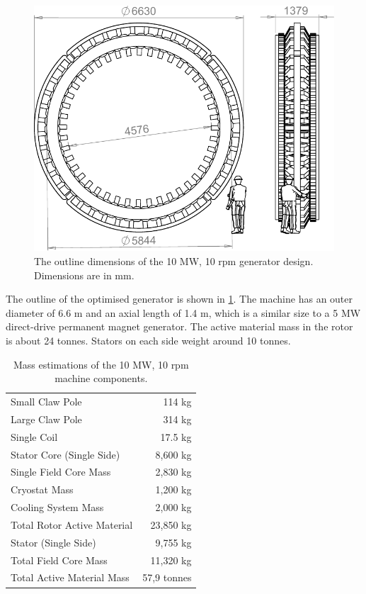 \documentclass[12pt]{iopart}
\begin{document}
\begin{figure}[t]
  \centering
    \includegraphics[]{10MW_outline_drawing}
  \caption{The outline dimensions of the 10 MW, 10 rpm generator design. Dimensions are in mm.}
  \label{10MW_drawing}
\end{figure}

The outline of the optimised generator is shown in \ref{10MW_drawing}. The machine has an outer diameter of 6.6 m and an axial length of 1.4 m, which is a similar size to a 5 MW direct-drive permanent magnet generator.
The active material mass in the rotor is about 24 tonnes. Stators on each side weight around 10 tonnes.

\begin{table}[t]
  \centering
  \begin{tabular}{lr}
\hline
Small Claw Pole & 114 kg \\
Large Claw Pole & 314 kg \\
Single Coil & 17.5 kg \\
Stator Core (Single Side) & 8,600 kg \\
Single Field Core Mass & 2,830 kg \\
\hline
Cryostat Mass & 1,200 kg \\
Cooling System Mass & 2,000 kg \\
Total Rotor Active Material & 23,850 kg \\
Stator (Single Side) & 9,755 kg \\
Total Field Core Mass & 11,320 kg \\
\hline
Total Active Material Mass & 57,9 tonnes \\
\hline
 \end{tabular}
  \caption{Mass estimations of the 10 MW, 10 rpm machine components.}
  \label{10MW_mass_spec}
\end{table}
\end{document}
